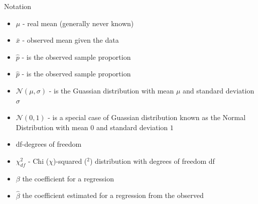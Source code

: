 \documentclass[10pt,a4paper]{article}
\begin{document}
\begin{multicols}{3}
\begin{textbox}{Notation}
\begin{itemize}
\item $\mu$ - real mean (generally never known)
\item $\bar{x}$ - observed mean given the data
\item $\hat {p}$ - is the observed sample proportion
\item $\hat {p}$ - is the observed sample proportion
\item $\mathcal{N}(\mu,\sigma)$ - is the Guassian distribution with mean $\mu$ and standard deviation $\sigma$
\item $\mathcal{N}(0,1)$ - is a special case of Guassian distribution known as the Normal Distribution with mean $0$ and standard deviation $1$
\item df-degrees of freedom
\item $\chi^2_{df}$ - Chi ($\chi$)-squared ($^2$) distribution with degrees of freedom df

\item $\beta$ the coefficient for a regression
\item $\hat{\beta}$ the coefficient estimated for a regression from the observed 

\end{itemize}


\end{textbox}
\end{multicols}
\end{document}
